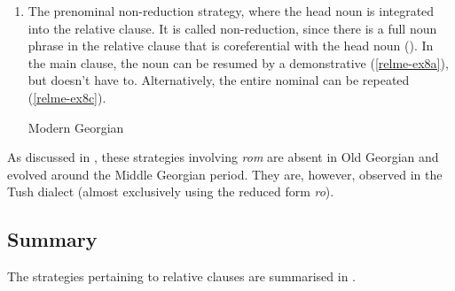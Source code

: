 \begin{enumerate}[label=\Roman*.]
\item The prenominal non-reduction strategy, where the head noun is integrated into the relative clause. It is called non-reduction, since there is a full noun phrase in the relative clause that is coreferential with the head noun (\cite{harris1994rel}). In the main clause, the noun can be resumed by a demonstrative (\ref{relme-ex8a}), but doesn’t have to. Alternatively, the entire nominal can be repeated (\ref{relme-ex8c}).

\begin{exe}
	\ex\label{relme-ex8}
    	Modern Georgian
\end{exe}
\end{enumerate}

As discussed in \textcite{harris1994rel}, these strategies involving \textit{rom} are absent in Old Georgian and evolved around the Middle Georgian period. They are, however, observed in the Tush dialect (almost exclusively using the reduced form \textit{ro}).


\subsection{Summary}\label{relsum}

The strategies pertaining to relative clauses are summarised in .


